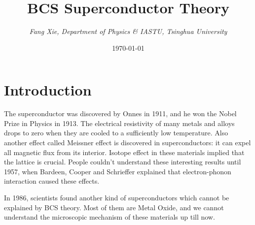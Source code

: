 \documentclass{article}
\author{\emph{Fang Xie, Department of Physics \& IASTU, Tsinghua University}}
\title{{\bf{BCS Superconductor Theory}}}
\date{\today}
\begin{document}
\maketitle
\section{Introduction}
The superconductor was discovered by Onnes in 1911, and he won the Nobel Prize in Physics in 1913. The electrical resistivity of many metals and alloys drops to zero when they are cooled to a sufficiently low temperature. Also another effect called Meissner effect is discovered in superconductors: it can expel all magnetic flux from its interior. Isotope effect in these materials implied that the lattice is crucial. People couldn't understand these interesting results until 1957, when Bardeen, Cooper and Schrieffer explained that electron-phonon interaction caused these effects.

In 1986, scientists found another kind of superconductors which cannot be explained by BCS theory. Most of them are Metal Oxide, and we cannot understand the microscopic mechanism of these materials up till now.
\end{document}
